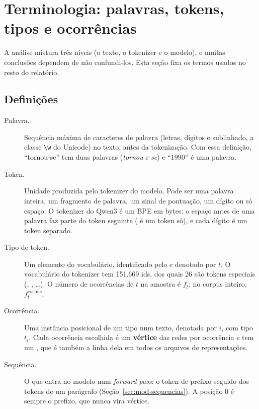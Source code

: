 \section{Terminologia: palavras, tokens, tipos e ocorrências}\label{sec:terminologia}

A análise mistura três níveis (o texto, o tokenizer e o modelo), e muitas conclusões dependem de
não confundi-los. Esta seção fixa os termos usados no resto do relatório.

\subsection{Definições}

\begin{description}
    \item[Palavra.] Sequência máxima de caracteres de palavra (letras, dígitos e sublinhado,
    a classe \verb|\w| do Unicode) no texto, antes da tokenização. Com essa definição,
    ``tornou-se'' tem duas palavras (\emph{tornou} e \emph{se}) e ``1990'' é uma palavra.
    \item[Token.] Unidade produzida pelo tokenizer do modelo. Pode ser uma palavra inteira, um
    fragmento de palavra, um sinal de pontuação, um dígito ou só espaço. O tokenizer do Qwen3 é
    um BPE em bytes: o espaço antes de uma palavra faz parte do token seguinte (
    é um token só), e cada dígito é um token separado.
    \item[Tipo de token.] Um elemento do vocabulário, identificado pelo  e
    denotado por $t$. O vocabulário do tokenizer tem 151.669 ids, dos quais 26 são tokens
    especiais (, , \ldots). O número de ocorrências de
    $t$ na amostra é $f_t$; no corpus inteiro, $f^{\mathrm{corpus}}_t$.
    \item[Ocorrência.] Uma instância posicional de um tipo num texto, denotada por $i$, com tipo
    $t_i$. Cada ocorrência escolhida é um \textbf{vértice} das redes por ocorrência e tem um
    , que é também a linha dela em todos os arquivos de representações.
    \item[Sequência.] O que entra no modelo num \emph{forward pass}: o token de prefixo
     seguido dos tokens de um parágrafo (Seção~\ref{sec:mod-sequencias}).
    A posição 0 é sempre o prefixo, que nunca vira vértice.
\end{description}

